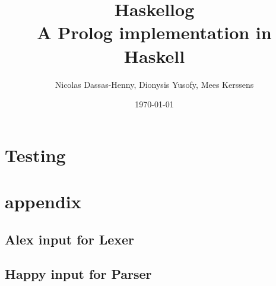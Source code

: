 \documentclass[12pt,a4paper]{article}
\title{Haskellog\\ A Prolog implementation in Haskell}
\author{Nicolas Dassas-Henny, Dionysis Yusofy, Mees Kerssens}
\date{\today}
\begin{document}
\nocite{*}

\maketitle

\tableofcontents

\clearpage









\section{Testing}




\section{appendix}
\subsection*{Alex input for Lexer}

\subsection*{Happy input for Parser}




\end{document}
